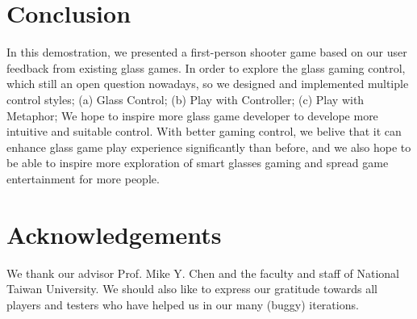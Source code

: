 \documentclass{sigchi}
\begin{document}



\section{Conclusion}
In this demostration, we presented a first-person shooter game based on our user feedback from existing glass games. In order to explore the glass gaming control, which still an open question nowadays, so we designed and implemented multiple control styles; (a) Glass Control; (b) Play with Controller; (c) Play with Metaphor; We hope to inspire more glass game developer to develope more intuitive and suitable control. With better gaming control, we belive that it can enhance glass game play experience significantly than before, and we also hope to be able to inspire more exploration of smart glasses gaming and spread game entertainment for more people.


\section{Acknowledgements}
We thank our advisor Prof. Mike Y. Chen and the faculty and staff of National Taiwan University. We should also like to express our gratitude towards all players and testers who have helped us in our many (buggy) iterations.

\balance



\end{document}
